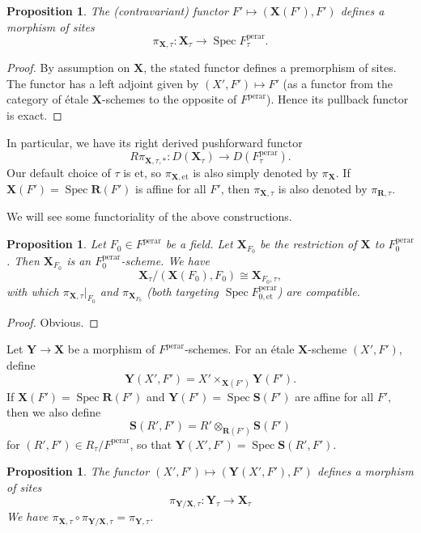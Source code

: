\documentclass{amsart}
\newtheorem{Prop}[Thm]{Proposition}
\theoremstyle{remark}
\numberwithin{equation}{subsection}
\newcommand{\compose}{\mathbin{\circ}}
\newcommand{\tensor}{\mathbin{\otimes}}
\newcommand{\et}{\mathrm{et}}
\newcommand{\perar}{\mathrm{perar}}
\newcommand{\alg}[1]{\mathbf{#1}}
\DeclareMathOperator{\Spec}{Spec}
\begin{document}
\begin{Prop} \label{0034}
	The (contravariant) functor $F' \mapsto (\alg{X}(F'), F')$ defines a morphism of sites
		\[
				\pi_{\alg{X}, \tau}
			\colon
				\alg{X}_{\tau}
			\to
				\Spec F^{\perar}_{\tau}.
		\]
\end{Prop}

\begin{proof}
	By assumption on $\alg{X}$, the stated functor defines a premorphism of sites.
	The functor has a left adjoint given by
	$(X', F') \mapsto F'$
	(as a functor from the category of \'etale $\alg{X}$-schemes to the opposite of $F^{\perar}$).
	Hence its pullback functor is exact.
\end{proof}

In particular, we have its right derived pushforward functor
	\[
			R \pi_{\alg{X}, \tau, \ast}
		\colon
			D(\alg{X}_{\tau})
		\to
			D(F^{\perar}_{\tau}).
	\]
Our default choice of $\tau$ is $\et$,
so $\pi_{\alg{X}, \et}$ is also simply denoted by $\pi_{\alg{X}}$.
If $\alg{X}(F') = \Spec \alg{R}(F')$ is affine for all $F'$,
then $\pi_{\alg{X}, \tau}$ is also denoted by $\pi_{\alg{R}, \tau}$.

We will see some functoriality of the above constructions.

\begin{Prop} \label{0527}
	Let $F_{0} \in F^{\perar}$ be a field.
	Let $\alg{X}_{F_{0}}$ be the restriction of $\alg{X}$ to $F_{0}^{\perar}$.
	Then $\alg{X}_{F_{0}}$ is an $F_{0}^{\perar}$-scheme.
	We have
		\[
				\alg{X}_{\tau} / (\alg{X}(F_{0}), F_{0})
			\cong
				\alg{X}_{F_{0}, \tau},
		\]
	with which $\pi_{\alg{X}, \tau}|_{F_{0}}$ and $\pi_{\alg{X}_{F_{0}}}$
	(both targeting $\Spec F^{\perar}_{0, \et}$) are compatible.
\end{Prop}

\begin{proof}
	Obvious.
\end{proof}

Let $\alg{Y} \to \alg{X}$ be a morphism of $F^{\perar}$-schemes.
For an \'etale $\alg{X}$-scheme $(X', F')$, define
	\[
			\alg{Y}(X', F')
		=
			X' \times_{\alg{X}(F')} \alg{Y}(F').
	\]
If $\alg{X}(F') = \Spec \alg{R}(F')$ and $\alg{Y}(F') = \Spec \alg{S}(F')$ are
affine for all $F'$,
then we also define
	\[
			\alg{S}(R', F')
		=
			R' \tensor_{\alg{R}(F')} \alg{S}(F')
	\]
for $(R', F') \in R_{\tau} / F^{\perar}$,
so that $\alg{Y}(X', F') = \Spec \alg{S}(R', F')$.

\begin{Prop} \label{0036}
	The functor $(X', F') \mapsto (\alg{Y}(X', F'), F')$
	defines a morphism of sites
		\[
				\pi_{\alg{Y} / \alg{X}, \tau}
			\colon
				\alg{Y}_{\tau}
			\to
				\alg{X}_{\tau}
		\]
	We have $\pi_{\alg{X}, \tau} \compose \pi_{\alg{Y} / \alg{X}, \tau} = \pi_{\alg{Y}, \tau}$.
\end{Prop}
\end{document}
